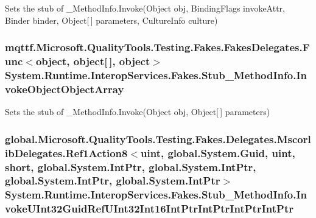 Sets the stub of \-\_\-\-Method\-Info.\-Invoke(\-Object obj, Binding\-Flags invoke\-Attr, Binder binder, Object\mbox{[}$\,$\mbox{]} parameters, Culture\-Info culture)

\hypertarget{class_system_1_1_runtime_1_1_interop_services_1_1_fakes_1_1_stub___method_info_a285b7da66ba81942445d1b8e457f6595}{
\subsubsection[{Invoke\-Object\-Object\-Array}]{\setlength{\rightskip}{0pt plus 5cm}mqttf.\-Microsoft.\-Quality\-Tools.\-Testing.\-Fakes.\-Fakes\-Delegates.\-Func$<$object, object\mbox{[}$\,$\mbox{]}, object$>$ System.\-Runtime.\-Interop\-Services.\-Fakes.\-Stub\-\_\-\-Method\-Info.\-Invoke\-Object\-Object\-Array}}\label{class_system_1_1_runtime_1_1_interop_services_1_1_fakes_1_1_stub___method_info_a285b7da66ba81942445d1b8e457f6595}


Sets the stub of \-\_\-\-Method\-Info.\-Invoke(\-Object obj, Object\mbox{[}$\,$\mbox{]} parameters)

\hypertarget{class_system_1_1_runtime_1_1_interop_services_1_1_fakes_1_1_stub___method_info_a595a92b616313e350c13ff1cf8b9510f}{
\subsubsection[{Invoke\-U\-Int32\-Guid\-Ref\-U\-Int32\-Int16\-Int\-Ptr\-Int\-Ptr\-Int\-Ptr\-Int\-Ptr}]{\setlength{\rightskip}{0pt plus 5cm}global.\-Microsoft.\-Quality\-Tools.\-Testing.\-Fakes.\-Delegates.\-Mscorlib\-Delegates.\-Ref1\-Action8$<$uint, global.\-System.\-Guid, uint, short, global.\-System.\-Int\-Ptr, global.\-System.\-Int\-Ptr, global.\-System.\-Int\-Ptr, global.\-System.\-Int\-Ptr$>$ System.\-Runtime.\-Interop\-Services.\-Fakes.\-Stub\-\_\-\-Method\-Info.\-Invoke\-U\-Int32\-Guid\-Ref\-U\-Int32\-Int16\-Int\-Ptr\-Int\-Ptr\-Int\-Ptr\-Int\-Ptr}}\label{class_system_1_1_runtime_1_1_interop_services_1_1_fakes_1_1_stub___method_info_a595a92b616313e350c13ff1cf8b9510f}


